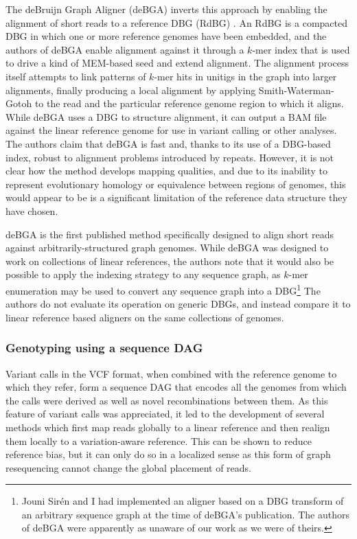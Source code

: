 \documentclass[a4paper,12pt,numbered,oneside]{Classes/PhDThesisPSnPDF}
\begin{document}
The deBruijn Graph Aligner (deBGA) inverts this approach by enabling the alignment of short reads to a reference DBG (RdBG) \cite{liu2016debga}.
An RdBG is a compacted DBG in which one or more reference genomes have been embedded, and the authors of deBGA enable alignment against it through a $k$-mer index that is used to drive a kind of MEM-based seed and extend alignment.
The alignment process itself attempts to link patterns of $k$-mer hits in unitigs in the graph into larger alignments, finally producing a local alignment by applying Smith-Waterman-Gotoh to the read and the particular reference genome region to which it aligns.
While deBGA uses a DBG to structure alignment, it can output a BAM file against the linear reference genome for use in variant calling or other analyses.
The authors claim that deBGA is fast and, thanks to its use of a DBG-based index, robust to alignment problems introduced by repeats.
However, it is not clear how the method develops mapping qualities, and due to its inability to represent evolutionary homology or equivalence between regions of genomes, this would appear to be is a significant limitation of the reference data structure they have chosen.

deBGA is the first published method specifically designed to align short reads against arbitrarily-structured graph genomes.
While deBGA was designed to work on collections of linear references, the authors note that it would also be possible to apply the indexing strategy to any sequence graph, as $k$-mer enumeration may be used to convert any sequence graph into a DBG\footnote{Jouni Sir\'{e}n and I had implemented an aligner based on a DBG transform of an arbitrary sequence graph at the time of deBGA's publication. The authors of deBGA were apparently as unaware of our work as we were of theirs.}
The authors do not evaluate its operation on generic DBGs, and instead compare it to linear reference based aligners on the same collections of genomes.

\subsubsection{Genotyping using a sequence DAG}
\label{sec:seq_dag_vcf}
Variant calls in the VCF format, when combined with the reference genome to which they refer, form a sequence DAG that encodes all the genomes from which the calls were derived as well as novel recombinations between them.
As this feature of variant calls was appreciated, it led to the development of several methods which first map reads globally to a linear reference and then realign them locally to a variation-aware reference.
This can be shown to reduce reference bias, but it can only do so in a localized sense as this form of graph resequencing cannot change the global placement of reads.
\end{document}
